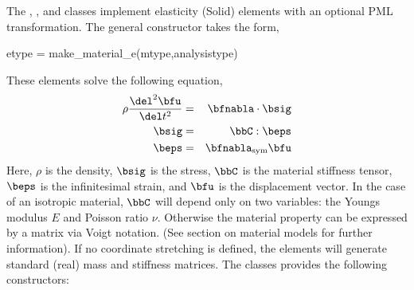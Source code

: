 The , , and 
classes implement elasticity (Solid) elements with an optional PML
transformation. 
The general constructor takes the form,
\begin{codelist}
  \item[etype = make\_material\_e(mtype,analysistype)]
\end{codelist}
These elements solve the following equation,
\begin{eqnarray}
\rho \frac{\del^2 \bfu}{\del t^2}
&=& \bfnabla\cdot\bsig \\
\bsig &=& \bbC:\beps \\
\beps &=& \bfnabla_\text{sym}\bfu
\end{eqnarray}
Here, $\rho$ is the density, $\bsig$ is the stress, $\bbC$ is the
material stiffness tensor, $\beps$ is the infinitesimal strain, and
$\bfu$ is the displacement vector. In the case of an isotropic material,
$\bbC$ will depend only on two variables: the Youngs modulus $E$ and 
Poisson ratio $\nu$. Otherwise the material property can be expressed
by a matrix via Voigt notation. (See section on material models for
further information).
 If no coordinate stretching is 
defined, the elements will generate standard (real) mass and 
stiffness matrices.
The classes provides the following constructors:
